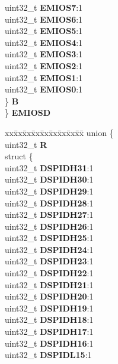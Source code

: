 \begin{DoxyCompactItemize}
\begin{tabbing}
\>\>uint32\_t {\bfseries EMIOS7}:1\\
\>\>uint32\_t {\bfseries EMIOS6}:1\\
\>\>uint32\_t {\bfseries EMIOS5}:1\\
\>\>uint32\_t {\bfseries EMIOS4}:1\\
\>\>uint32\_t {\bfseries EMIOS3}:1\\
\>\>uint32\_t {\bfseries EMIOS2}:1\\
\>\>uint32\_t {\bfseries EMIOS1}:1\\
\>\>uint32\_t {\bfseries EMIOS0}:1\\
\>\} {\bfseries B}\\
\} {\bfseries EMIOSD}\\

\end{tabbing}\item 
\mbox{\label{structSIU__tag_a1c67d67a469e76c9aefe7bbdf16dadef}} 
\begin{tabbing}
xx\=xx\=xx\=xx\=xx\=xx\=xx\=xx\=xx\=\kill
union \{\\
\>uint32\_t {\bfseries R}\\
\>struct \{\\
\>\>uint32\_t {\bfseries DSPIDH31}:1\\
\>\>uint32\_t {\bfseries DSPIDH30}:1\\
\>\>uint32\_t {\bfseries DSPIDH29}:1\\
\>\>uint32\_t {\bfseries DSPIDH28}:1\\
\>\>uint32\_t {\bfseries DSPIDH27}:1\\
\>\>uint32\_t {\bfseries DSPIDH26}:1\\
\>\>uint32\_t {\bfseries DSPIDH25}:1\\
\>\>uint32\_t {\bfseries DSPIDH24}:1\\
\>\>uint32\_t {\bfseries DSPIDH23}:1\\
\>\>uint32\_t {\bfseries DSPIDH22}:1\\
\>\>uint32\_t {\bfseries DSPIDH21}:1\\
\>\>uint32\_t {\bfseries DSPIDH20}:1\\
\>\>uint32\_t {\bfseries DSPIDH19}:1\\
\>\>uint32\_t {\bfseries DSPIDH18}:1\\
\>\>uint32\_t {\bfseries DSPIDH17}:1\\
\>\>uint32\_t {\bfseries DSPIDH16}:1\\
\>\>uint32\_t {\bfseries DSPIDL15}:1\\

\end{tabbing}
\end{DoxyCompactItemize}
